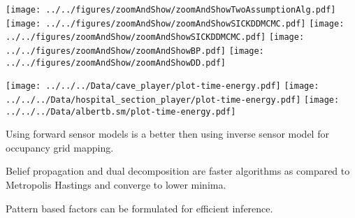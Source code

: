 \documentclass[final]{beamer}
\begin{document}
\begin{multicols}{3}
    \begin{minipage}[c]{1.0\columnwidth}
      \begin{center}
       \texttt{[image: ../../figures/zoomAndShow/zoomAndShowTwoAssumptionAlg.pdf]}%
       \texttt{[image: ../../figures/zoomAndShow/zoomAndShowSICKDDMCMC.pdf]}%
       \texttt{[image: ../../figures/zoomAndShow/zoomAndShowSICKDDMCMC.pdf]}%
       \texttt{[image: ../../figures/zoomAndShow/zoomAndShowBP.pdf]}%
       \texttt{[image: ../../figures/zoomAndShow/zoomAndShowDD.pdf]}%
      \end{center}
    \end{minipage}
    \providecommand{\mysubfloatwidth}{0.33\columnwidth}
    \begin{minipage}[c]{1.0\columnwidth}
      \begin{center}
        \texttt{[image: ../../../Data/cave\_player/plot-time-energy.pdf]}%
        \texttt{[image: ../../../Data/hospital\_section\_player/plot-time-energy.pdf]}%
        \texttt{[image: ../../../Data/albertb.sm/plot-time-energy.pdf]}%
      \end{center}
    \end{minipage}

    \vfill\columnbreak


    \begin{packedEnumerate}
        \item Using forward sensor models is a better then using inverse sensor
          model for occupancy grid mapping.
        \item Belief propagation and dual decomposition are faster algorithms
          as compared to Metropolis Hastings and converge to lower minima.
        \item Pattern based factors can be formulated for efficient inference.
    \end{packedEnumerate}
    

\end{multicols}
\end{document}
